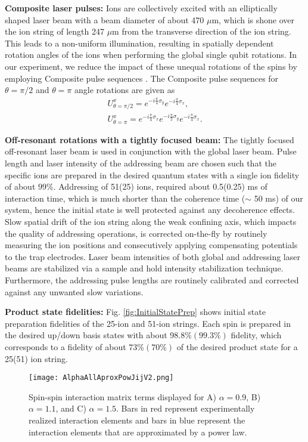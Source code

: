 \documentclass[aps,10pt,reprint,groupedaddress,superscriptaddress]{revtex4-2}
\begin{document}
\textbf{Composite laser pulses:} Ions are collectively excited with an elliptically shaped laser beam with a beam diameter of about 470 $\mu$m, which is shone over the ion string of length 247 $\mu$m from the transverse direction of the ion string. This leads to a non-uniform illumination, resulting in spatially dependent rotation angles of the ions when performing the global single qubit rotations. In our experiment, we reduce the impact of these unequal rotations of the spins by employing Composite pulse sequences \cite{Torosov2012}. The Composite pulse sequences for $\theta=\pi/2$ and $\theta=\pi$ angle rotations are given as
\begin{eqnarray}
    U^{x}_{\theta=\pi/2}=e^{-i\frac{\pi}{4}\sigma_y}e^{-i\frac{\pi}{4}\sigma_x},\\
    U^{x}_{\theta=\pi}=e^{-i\frac{\pi}{4}\sigma_x}e^{-i\frac{\pi}{2}\sigma_y}e^{-i\frac{\pi}{4}\sigma_x}.
\end{eqnarray}

\textbf{Off-resonant rotations with a tightly focused beam:} The tightly focused off-resonant laser beam is used in conjunction with the global laser beam. Pulse length and laser intensity of the addressing beam are chosen such that the specific ions are prepared in the desired quantum states with a single ion fidelity of about $99\%$. Addressing of 51(25) ions, required about 0.5(0.25) ms of interaction time, which is much shorter than the coherence time ($\sim$ 50 ms) of our system, hence the initial state is well protected against any decoherence effects. Slow spatial drift of the ion string along the weak confining axis, which impacts the quality  of addressing operations, is corrected on-the-fly by routinely measuring the ion positions and consecutively applying compensating potentials to the trap electrodes. Laser beam intensities of both global and addressing laser beams are stabilized via a sample and hold intensity stabilization technique. Furthermore, the addressing pulse lengths are routinely calibrated and corrected against any unwanted slow variations. 

\textbf{Product state fidelities:} Fig. \ref{fig:InitialStatePrep} shows initial state preparation fidelities of the 25-ion and 51-ion strings. Each spin is prepared in the desired up/down basis states with about 98.8$\% (99.3\%)$ fidelity, which corresponds to  a fidelity of about $ 73$\%$(70\%)$ of the desired product state for a 25(51) ion string.


\begin{figure*}
\centering
\texttt{[image: AlphaAllAproxPowJijV2.png]}
\caption{Spin-spin interaction matrix terms displayed for A) $\alpha =0.9$, B) $\alpha =1.1$, and C) $\alpha =1.5$. Bars in red represent experimentally realized interaction elements and bars in blue represent the interaction elements that are approximated by a power law.} \label{fig:ApproxPowLaw}
\end{figure*}
\end{document}
